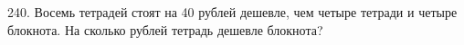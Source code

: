 240. Восемь тетрадей стоят на 40 рублей дешевле, чем четыре тетради и четыре блокнота. На сколько рублей тетрадь дешевле блокнота?\\
